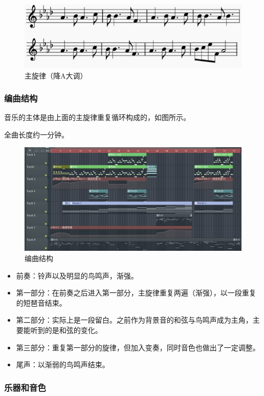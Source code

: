 \documentclass[a4paper,12pt]{article} %
\begin{document}
\begin{figure}[H]
    \centering
    \includegraphics[width=0.8\linewidth]{images/Brown-main.png}
    \caption{主旋律（降A大调）}
    \label{fig:brown-main}
\end{figure}

\subsubsection{编曲结构}
音乐的主体是由上面的主旋律重复循环构成的，如图所示。

全曲长度约一分钟。
\begin{figure}[H]
    \centering
    \includegraphics[width=1.0\linewidth]{images/Brown-flstudio.png}
    \caption{编曲结构}
    \label{fig:enter-label}
\end{figure}
\begin{itemize}
    \item 前奏：铃声以及明显的鸟鸣声，渐强。
    \item 第一部分：在前奏之后进入第一部分，主旋律重复两遍（渐强），以一段重复的短琶音结束。
    \item 第二部分：实际上是一段留白。之前作为背景音的和弦与鸟鸣声成为主角，主要能听到的是和弦的变化。
    \item 第三部分：重复第一部分的旋律，但加入变奏，同时音色也做出了一定调整。
    \item 尾声：以渐弱的鸟鸣声结束。
\end{itemize}


\subsubsection{乐器和音色}
\end{document}
